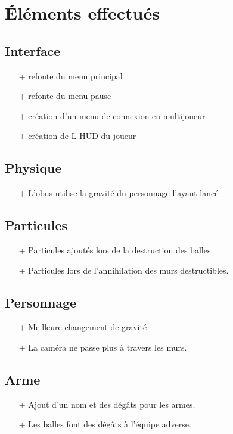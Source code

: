 ﻿\documentclass[12pt]{article}
\begin{document}
\section{Éléments effectués}
\subsection{Interface}
\begin{itemize}
\item[+] refonte du menu principal
\item[+] refonte du menu pause
\item[+] création d'un menu de connexion en multijoueur
\item[+] création de L HUD du joueur
\end{itemize}

\subsection{Physique}
\begin{itemize}
\item[+] L'obus utilise la gravité du personnage l'ayant lancé
\end{itemize}

\subsection{Particules}
\begin{itemize}
\item[+] Particules ajoutés lors de la destruction des balles.
\item[+] Particules lors de l'annihilation des murs destructibles.
\end{itemize}

\subsection{Personnage}
\begin{itemize}
\item[+] Meilleure changement de gravité
\item[+] La caméra ne passe plus à travers les murs.
\end{itemize}

\subsection{Arme}
\begin{itemize}
\item[+] Ajout d'un nom et des dégâts pour les armes.
\item[+] Les balles font des dégâts à l'équipe adverse.
\end{itemize}
\end{document}
